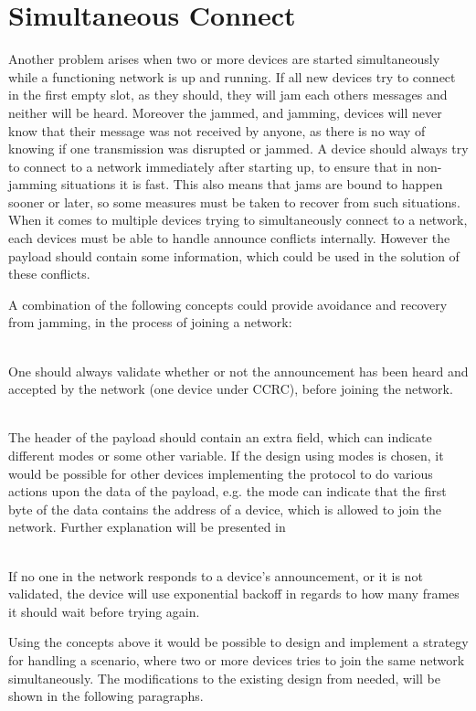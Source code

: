 \section{Simultaneous Connect} %
\label{sec:simultaneous_connect}

Another problem arises when two or more devices are started simultaneously while a functioning network is up and running.
If all new devices try to connect in the first empty slot, as they should, they will jam each others messages and neither will be heard.
Moreover the jammed, and jamming, devices will never know that their message was not received by anyone, as there is no way of knowing if one transmission was disrupted or jammed.
A device should always try to connect to a network immediately after starting up, to ensure that in non-jamming situations it is fast.
This also means that jams are bound to happen sooner or later, so some measures must be taken to recover from such situations.
When it comes to multiple devices trying to simultaneously connect to a network, each devices must be able to handle announce conflicts internally.
However the payload should contain some information, which could be used in the solution of these conflicts.

A combination of the following concepts could provide avoidance and recovery from jamming, in the process of joining a network: 
\begin{description}[labelindent=\parindent]
    \item[Validation]\hfill\\
    One should always validate whether or not the announcement has been heard and accepted by the network (one device under CCRC), before joining the network.
    \item[Payload Mode]\hfill\\
    The header of the payload should contain an extra field, which can indicate different modes or some other variable.
    If the design using modes is chosen, it would be possible for other devices implementing the protocol to do various actions upon the data of the payload, e.g. the mode can indicate that the first byte of the data contains the address of a device, which is allowed to join the network.
    Further explanation will be presented in 
    \item[Exponential Backoff]\hfill\\ 
    If no one in the network responds to a device's announcement, or it is not validated, the device will use exponential backoff in regards to how many frames it should wait before trying again.
\end{description} 
\noindent
Using the concepts above it would be possible to design and implement a strategy for handling a scenario, where two or more devices tries to join the same network simultaneously.
The modifications to the existing design from  needed, will be shown in the following paragraphs.

